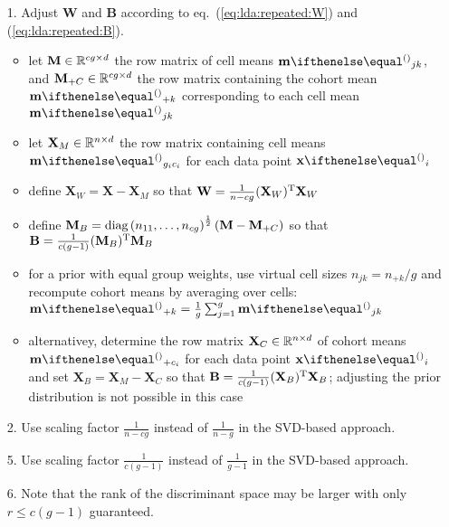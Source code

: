 \documentclass[a4paper]{article}
\begin{document}
\begin{enumerate}
\item[1.] Adjust $\mathbf{W}$ and $\mathbf{B}$ according to eq.~(\ref{eq:lda:repeated:W}) and (\ref{eq:lda:repeated:B}).
  \begin{itemize}
  \item let $\mathbf{M}\in \mathbb{R}^{cg\times d}$ the row matrix of cell means $\vm_{jk}$, and $\mathbf{M}_{+C} \in \mathbb{R}^{cg\times d}$ the row matrix containing the cohort mean $\vm_{+k}$ corresponding to each cell mean $\vm_{jk}$
  \item let $\mathbf{X}_M\in \mathbb{R}^{n\times d}$ the row matrix containing cell means $\vm_{g_i c_i}$ for each data point $\vx_i$
  \item define $\mathbf{X}_W = \mathbf{X} - \mathbf{X}_M$ so that $\mathbf{W} = \frac1{n - cg} (\mathbf{X}_W)^{\text{T}} \mathbf{X}_W$
  \item define $\mathbf{M}_B = \mathop{\text{diag}}\left(n_{11}, \ldots, n_{cg}\right)^{\frac12} (\mathbf{M} - \mathbf{M}_{+C})$ so that $\mathbf{B} = \frac{1}{c (g - 1)} (\mathbf{M}_B)^{\text{T}} \mathbf{M}_B$
  \item for a prior with equal group weights, use virtual cell sizes $n_{jk} = n_{+k} / g$ and recompute cohort means by averaging over cells: $\vm_{+k} = \frac1g \sum_{j=1}^g \vm_{jk}$
  \item alternativey, determine the row matrix $\mathbf{X}_C\in \mathbb{R}^{n\times d}$ of cohort means $\vm_{+ c_i}$ for each data point $\vx_i$ and set $\mathbf{X}_B = \mathbf{X}_M - \mathbf{X}_C$ so that $\mathbf{B} = \frac{1}{c (g - 1)} (\mathbf{X}_B)^{\text{T}} \mathbf{X}_B$; adjusting the prior distribution is not possible in this case 
  \end{itemize}
\item[2.] Use scaling factor $\frac1{n - cg}$ instead of $\frac1{n - g}$ in the SVD-based approach.
\item[5.] Use scaling factor $\frac1{c (g - 1)}$ instead of $\frac1{g - 1}$ in the SVD-based approach.
\item[6.] Note that the rank of the discriminant space may be larger with only $r \leq c(g - 1)$ guaranteed.
\end{enumerate}


\section{}
\label{sec:A}
\end{document}
